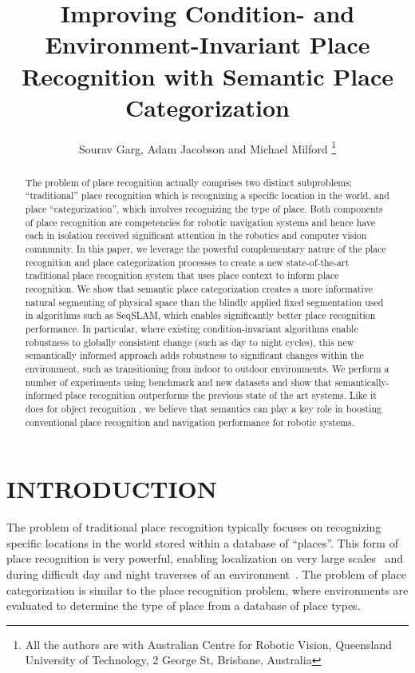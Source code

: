 \documentclass[letterpaper, 10 pt, conference]{ieeeconf}  %
\title{\LARGE \bf
Improving Condition- and Environment-Invariant Place Recognition with Semantic Place Categorization
}
\author{Sourav Garg, Adam Jacobson and Michael Milford%
\thanks{All the authors are with Australian Centre for Robotic Vision,
        Queensland University of Technology,
        2 George St, Brisbane, Australia}%
}
\begin{document}
\maketitle
\thispagestyle{empty}
\pagestyle{empty}


\begin{abstract}
The problem of place recognition actually comprises two distinct subproblems; ``traditional'' place recognition which is recognizing a specific location in the world, and place ``categorization'', which involves recognizing the type of place. Both components of place recognition are competencies for robotic navigation systems and hence have each in isolation received significant attention in the robotics and computer vision community. In this paper, we leverage the powerful complementary nature of the place recognition and place categorization processes to create a new state-of-the-art traditional place recognition system that uses place context to inform place recognition. We show that semantic place categorization creates a more informative natural segmenting of physical space than the blindly applied fixed segmentation used in algorithms such as SeqSLAM, which enables significantly better place recognition performance. In particular, where existing condition-invariant algorithms enable robustness to globally consistent change (such as day to night cycles), this new semantically informed approach adds robustness to significant changes within the environment, such as transitioning from indoor to outdoor environments. We perform a number of experiments using benchmark and new datasets and show that semantically-informed place recognition outperforms the previous state of the art systems. Like it does for object recognition \cite{sunderhauf2016place}, we believe that  semantics can play a key role in boosting conventional place recognition and navigation performance for robotic systems.
\end{abstract}

\section{INTRODUCTION}


The problem of traditional place recognition typically focuses on recognizing specific locations in the world stored within a database of ``places''. This form of place recognition is very powerful, enabling localization on very large scales~\cite{Cummins2009} and during difficult day and night traverses of an environment~\cite{Milford2012}. The problem of place categorization is similar to the place recognition problem, where environments are evaluated to determine the type of place from a database of place types. 
\end{document}
